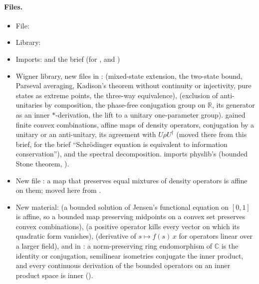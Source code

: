 \documentclass[11pt]{article}
\begin{document}
\paragraph{Files.}\leavevmode
\begin{itemize}
\item File: 
\item Library: 
\item Imports:\newline {} and the brief
   (for ,  and
  )
\item Wigner library, new files in :
   (mixed-state extension, the two-state bound, Parseval averaging, Kadison's
  theorem without continuity or injectivity, pure states as extreme points, the three-way
  equivalence),  (exclusion of anti-unitaries by composition, the phase-free
  conjugation group on $\mathbb{R}$, its generator as an inner $*$-derivation, the lift to a
  unitary one-parameter group).  gained finite convex combinations, affine maps
  of density operators, conjugation  by a unitary or an anti-unitary, its agreement
   with $U\rho U^\dagger$ (moved there from this brief, for the brief
  ``Schr\"odinger equation is equivalent to information conservation''), and the spectral
  decomposition.  imports physlib's
   (bounded Stone theorem,
  ).
\item New file : a map that
  preserves equal mixtures of density operators is affine on them; 
  moved here from .
\item New  material:\newline
   (a bounded solution of Jensen's functional
  equation on $[0,1]$ is affine, so a bounded map preserving midpoints on a convex set preserves
  convex combinations),\newline
   (a positive operator kills every
  vector on which its quadratic form vanishes),\newline
   (derivative of
  $s \mapsto f(s)\,x$ for operators linear over a larger field),\newline
  and in : a norm-preserving ring
  endomorphism of $\mathbb{C}$ is the identity or conjugation, semilinear isometries conjugate the
  inner product, and every continuous derivation of the bounded operators on an inner product
  space is inner ().
\end{itemize}
\end{document}
